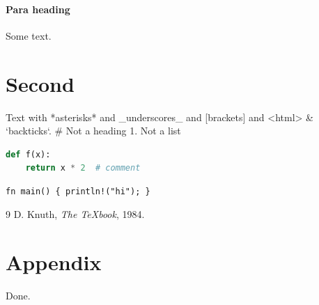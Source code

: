 \documentclass[11pt]{article}
\begin{document}
\paragraph{Para heading} Some text.
\section{Second}
Text with *asterisks* and _underscores_ and [brackets] and <html> & `backticks`.
# Not a heading
1. Not a list
\begin{lstlisting}[language=Python]
def f(x):
    return x * 2  # comment
\end{lstlisting}
\begin{verbatim}
fn main() { println!("hi"); }
\end{verbatim}

\begin{thebibliography}{9}
 D. Knuth, \emph{The TeXbook}, 1984.
\end{thebibliography}
\appendix
\section{Appendix}
Done.
\end{document}
